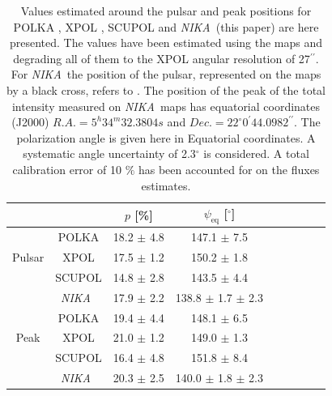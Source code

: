 \documentclass[twocolumn,traditabstract]{aa}
\def\NIKA{\textit{NIKA}}
\begin{document}
\begin{table}[h!]
  \centering
      \begin{tabular}{ccccccccc}
     &  & \small $p$ [\%] & \small $\psi_{\textrm{eq}}$ [$^\circ$] & \\ 
\hline
\hline
      &\small POLKA  & \small 18.2 $\pm$ \small 4.8 & \small 147.1 $\pm$ \small 7.5  \\
      \small Pulsar &\small XPOL   & \small 17.5 $\pm$ \small 1.2 & \small 150.2 $\pm$ \small 1.8   \\
     &\small SCUPOL & \small 14.8 $\pm$ \small 2.8 & \small 143.5 $\pm$ \small 4.4 & \\
      &\small \NIKA\ & \small 17.9 $\pm$ \small 2.2 & \small 138.8 $\pm$ \small 1.7 $\pm$ \small 2.3 \\
      \hline

      &\small POLKA  & \small 19.4 $\pm$ \small 4.4 & \small 148.1 $\pm$ \small 6.5   \\
       \small Peak &\small XPOL  &  \small 21.0 $\pm$ 1.2 & \small 149.0 $\pm $ \small 1.3   \\
      &\small SCUPOL  & \small 16.4 $\pm$ 4.8 & \small 151.8 $\pm$ \small 8.4\\
      &\small \NIKA\ & \small 20.3 $\pm$ \small 2.5 & \small 140.0 $\pm$ \small 1.8 $\pm$ \small 2.3 \\
\hline
\hline
    \end{tabular}
   \caption{Values estimated around the pulsar and peak positions for POLKA \citep{2014PASP..126.1027W}, XPOL \citep{aumont2010}, SCUPOL \citep{scubapol} and \NIKA\ (this paper) are here presented. The values have been estimated using the maps and degrading all of them to the XPOL angular resolution of 27$^{\prime\prime}$. For \NIKA\ the position of the pulsar, represented on the maps by a black cross, refers to \cite{Lobanov}. The position of the peak of the total intensity measured on \NIKA\ maps has equatorial coordinates (J2000) $R.A. =5^h34^m32.3804s$ and $Dec. = 22^{\circ}0^{\prime}44.0982^{\prime\prime}$. The polarization angle is given here in Equatorial coordinates. A systematic angle uncertainty of 2.3$^{\circ}$ is considered. A total calibration error of 10 $\%$ has been accounted for on the fluxes estimates.}
\label{tab:peak_pulsar_others}
 \end{table}
\end{document}
